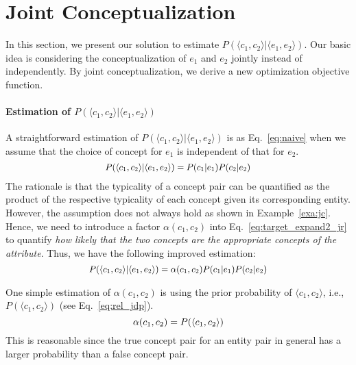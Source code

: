 
\section{Joint Conceptualization}
In this section, we present our solution to estimate $ P(\langle c_1,c_2 \rangle | \langle e_1,e_2\rangle) $.
Our basic idea is considering the conceptualization of $e_1$ and $e_2$ jointly instead of independently.
By joint conceptualization, we derive a new optimization objective function.

\vspace{-2mm}
\paragraph{Estimation of $P(\langle c_1,c_2\rangle | \langle e_1,e_2\rangle)$ }
A straightforward estimation of $P( \langle c_{1},c_{2} \rangle | \langle e_{1},e_{2} \rangle )$ is as Eq.~\ref{eq:naive} when we assume that the choice of concept for $e_1$ is independent of that for $e_2$.
\begin{equation}
\label{eq:naive}
\small
\begin{split}
P(\langle c_{1},c_{2}\rangle |\langle e_{1},e_{2} \rangle) = P(c_1|e_1) P(c_2|e_2)
\end{split}
\end{equation} The rationale is that the typicality of a concept pair can be quantified as the product of the respective typicality of each concept given its corresponding entity.
However, the assumption does not always hold as shown in Example~\ref{exa:jc}. Hence, we need to introduce a factor $\alpha(c_1,c_2)$ into Eq.~\ref{eq:target_expand2_jr} to quantify {\it how likely that the two concepts are the appropriate concepts of the attribute}. Thus, we have the following improved estimation:
\begin{equation}
\label{eq:target_expand2_jr}
\small
\begin{split}
P(\langle c_{1},c_{2}\rangle |\langle e_{1},e_{2} \rangle) = \alpha(c_1,c_2)  P(c_1|e_1)  P(c_2|e_2)
\end{split}
\end{equation}


One simple estimation of $\alpha(c_1,c_2)$ is using the prior probability of $\langle c_1, c_2\rangle$, i.e., $P(\langle c_1,c_2\rangle)$ (see Eq.~\ref{eq:rel_jdp}).
\begin{equation}\label{eq:rel_jdp}
\small
  \alpha(c_1,c_2) = P(\langle c_1, c_2\rangle)
\end{equation}
This is reasonable since the true concept pair for an entity pair in general has a larger probability than
a false concept pair.


